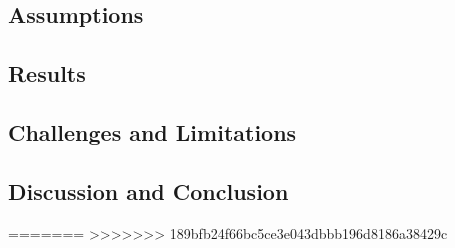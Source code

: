 \documentclass[10pt,]{article}
\begin{document}
\subsection{Assumptions}\label{assumptions}

\subsection{Results}\label{results}

\subsection{Challenges and
Limitations}\label{challenges-and-limitations}

\subsection{Discussion and Conclusion}\label{discussion-and-conclusion}

=======
>>>>>>> 189bfb24f66bc5ce3e043dbbb196d8186a38429c
\end{document}
